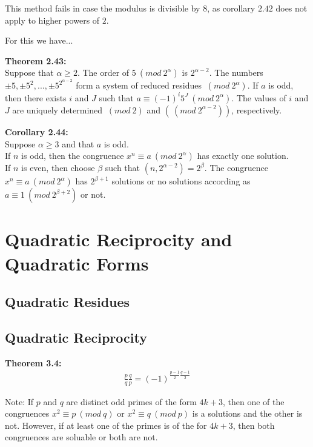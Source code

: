 \documentclass[a4paper]{article}
\begin{document}
This method fails in case the modulus is divisible by $8$, as corollary $2.42$ does not apply to higher powers of $2$.

For this we have...

\textbf{Theorem 2.43:}\\
Suppose that $\alpha\geq 2$. The order of $5 \ (mod\ 2^\alpha)$ is $2^{\alpha-2}$. The numbers $\pm 5,\pm 5^2,...,\pm 5^2^{\alpha-2}$ form a system of reduced residues $\ (mod\ 2^{\alpha})$. If $a$ is odd, then there exists $i$ and $J$ such that $a \equiv  (-1)^i5^J \ (mod\ 2^{\alpha})$. The values of $i$ and $J$ are uniquely determined $\ (mod\ 2)$ and $(\ (mod\ 2^{\alpha-2}))$, respectively.

\textbf{Corollary 2.44:}\\
Suppose $\alpha \geq 3$ and that $a$ is odd.\\
If $n$ is odd, then the congruence $x^n \equiv  a \ (mod\ 2^{\alpha})$ has exactly one solution.\\
If $n$ is even, then choose $\beta$ such that $(n,2^{\alpha-2})=2^\beta$. The congruence $x^n \equiv a \ (mod\ 2^{\alpha})$ has $2^{\beta+1}$ solutions or no solutions according as $a \equiv  1 \ (mod\ 2^{\beta+2})$ or not.


\section{Quadratic Reciprocity and Quadratic Forms}

\subsection{Quadratic Residues}

\subsection{Quadratic Reciprocity}


\textbf{Theorem 3.4:}\\

\begin{align}
    \frac{p}{q}\frac{q}{p}=(-1)^{\frac{p-1}{2}\frac{q-1}{2}}
\end{align}

Note: If $p$ and $q$ are distinct odd primes of the form $4k+3$, then one of the congruences $x^2\equiv p\ (mod\ q)$ or $x^2\equiv q\ (mod\ p)$ is a solutions and the other is not. However, if at least one of the primes is of the for $4k+3$, then both congruences are soluable or both are not.
\end{document}
